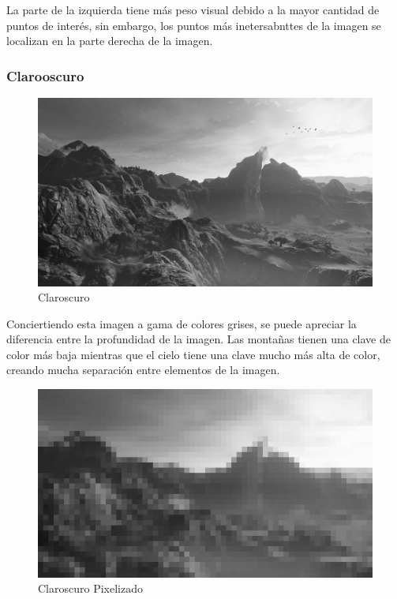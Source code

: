 \documentclass[12pt]{article}
\begin{document}
            La parte de la izquierda tiene más peso visual debido a la mayor cantidad de puntos de interés, sin embargo, los puntos más inetersabnttes de la imagen se localizan en la parte derecha de la imagen. 
      
        \subsubsection{Clarooscuro}
          \begin{figure}[H]
            \centering
            \includegraphics[scale = 0.2]{Jesus/Seccion16/claroscuro.jpg}
            \caption{Claroscuro}
          \end{figure}

          Conciertiendo esta imagen a gama de colores grises, se puede apreciar la diferencia entre la profundidad de la imagen. 
          Las montañas tienen una clave de color más baja mientras que el cielo tiene una clave mucho más alta de color, creando mucha separación entre elementos de la imagen. 

          \begin{figure}[H]
            \centering
            \includegraphics[scale = 0.2]{Jesus/Seccion16/pixelart.jpg}
            \caption{Claroscuro Pixelizado}
          \end{figure}
\end{document}
